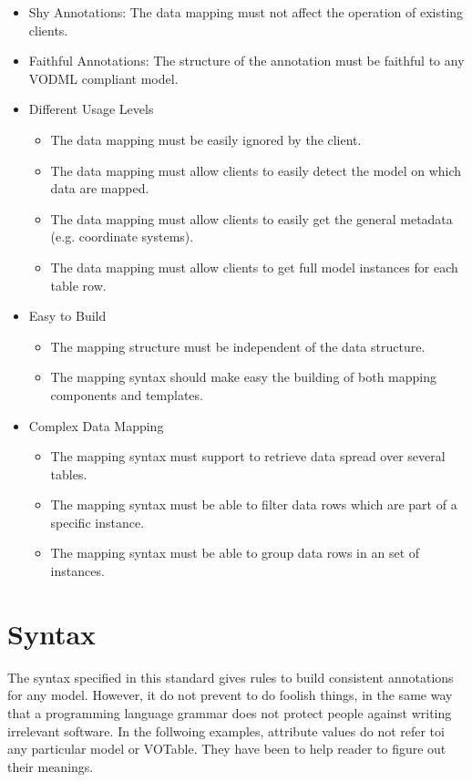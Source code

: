 \documentclass[11pt,a4paper]{ivoa}
\begin{document}
\begin{itemize}
\item Shy Annotations: The data mapping must not affect the operation of existing clients.

\item Faithful Annotations: The structure of the annotation must be faithful to any VODML compliant model. 


\item Different Usage Levels 
\begin{itemize}
   \item The data mapping must be easily ignored by the client.
   \item The data mapping must allow clients to easily detect the model on which data are mapped.
   \item The data mapping must allow clients to easily get the general metadata (e.g. coordinate systems).
   \item The data mapping must allow clients to get full model instances for each table row.
\end{itemize}

\item Easy to Build 
\begin{itemize}
   \item The mapping structure must be independent of the data structure.
   \item The mapping syntax should make easy the building of both mapping components and templates.
\end{itemize}

\item Complex Data Mapping 
\begin{itemize}
   \item The mapping syntax must support to retrieve data spread over several tables.
   \item The mapping syntax must be able to filter data rows which are part of a specific instance.
   \item The mapping syntax must be able to group data rows in an set of instances.
\end{itemize}
\end{itemize}


\section{Syntax}


The syntax specified in this standard gives rules to build consistent annotations for any model. However, it do not prevent to do foolish things, in the same way that a programming language grammar does not protect people against writing irrelevant software.
In the follwoing examples, attribute values do not refer toi any particular model or VOTable. They have been to help reader to figure out their meanings.
\end{document}
